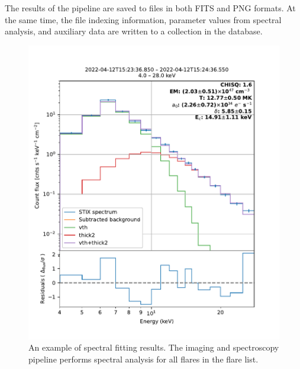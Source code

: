 \documentclass[referee]{aa} %
\begin{document}
The results of the pipeline are saved to files in both FITS and PNG formats. At the same time, the file indexing information, parameter values from spectral analysis, and auxiliary data are written to a collection in the database. 


\begin{figure}[h]
  \centering
  \includegraphics[width=0.9\linewidth]{figures/ospex.pdf}
  \caption{An example of spectral fitting results. 
    The imaging and spectroscopy pipeline performs
    spectral analysis for all flares in the flare list. }
  \label{fig:ospex}
\end{figure}
\end{document}
